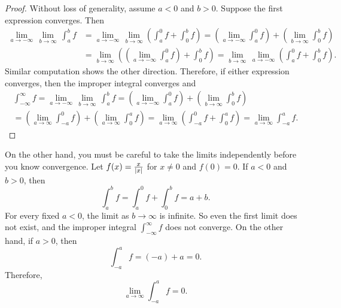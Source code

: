 \begin{proof}
Without loss of generality, assume $a < 0$ and $b > 0$.  Suppose
the first expression converges.  Then
\begin{equation*}
\begin{split}
\lim_{a \to -\infty} \, \lim_{b \to \infty} \, \int_a^b f
& =
\lim_{a \to -\infty} \, \lim_{b \to \infty}
\left(
\int_a^0 f
+
\int_0^b f
\right)
=
\left(
\lim_{a \to -\infty}
\int_a^0 f
\right)
+
\left(
 \lim_{b \to \infty}
\int_0^b f
\right) \\
& = 
 \lim_{b \to \infty}
\left(
\left(
\lim_{a \to -\infty}
\int_a^0 f
\right) 
+
\int_0^b f
\right)
=
 \lim_{b \to \infty} \,
\lim_{a \to -\infty}
\left(
\int_a^0 f
+
\int_0^b f
\right)  .
\end{split}
\end{equation*}
Similar computation shows the other direction.  Therefore, if
either expression converges, then the improper integral converges
and
\begin{multline*}
\int_{-\infty}^\infty f
=
\lim_{a \to -\infty} \, \lim_{b \to \infty} \, \int_a^b f
=
\left(
\lim_{a \to -\infty}
\int_a^0 f
\right)
+
\left(
 \lim_{b \to \infty}
\int_0^b f
\right)
\\
=
\left(
\lim_{a \to \infty}
\int_{-a}^0 f
\right)
+
\left(
 \lim_{a \to \infty}
\int_0^a f
\right)
=
\lim_{a \to \infty}
\left(
\int_{-a}^0 f
+
\int_0^a f
\right)
=
\lim_{a \to \infty}
\int_{-a}^a f .
\end{multline*}
\end{proof}

\begin{example}
On the other hand, you must be careful to
take the limits independently before you know convergence.  Let
$f(x) = \frac{x}{\lvert {x} \rvert}$ for $x \neq 0$ and $f(0) = 0$.
If $a < 0$ and $b > 0$, then
\begin{equation*}
\int_{a}^b f
=
\int_{a}^0 f
+
\int_{0}^b f
=
a+b .
\end{equation*}
For every fixed $a < 0$, the limit as $b \to \infty$ is infinite.
So even the first limit does not exist,
and the improper integral $\int_{-\infty}^\infty f$ does not converge.
On the other hand, if $a > 0$, then
\begin{equation*}
\int_{-a}^{a} f
=
(-a)+a = 0 .
\end{equation*}
Therefore,
\begin{equation*}
\lim_{a\to\infty}
\int_{-a}^{a} f
= 0 .
\end{equation*}
\end{example}

